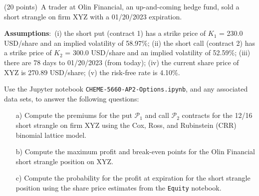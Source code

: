 \item{(20 points)~A trader at Olin Financial, an up-and-coming hedge fund, sold a short strangle on firm XYZ with a 01/20/2023 expiration. 

\textbf{Assumptions}:~(i) the short put (contract 1) has a strike price of $K_{1}$ = 230.0 USD/share and an implied volatility of 58.97\%;
(ii) the short call (contract 2) has a strike price of $K_{2}$ = 300.0 USD/share and an implied volatility of 52.59\%;
(iii) there are 78 days to 01/20/2023 (from today); (iv) the current share price of XYZ is 270.89 USD/share; (v) the risk-free rate is 4.10\%.

Use the Jupyter notebook \texttt{CHEME-5660-AP2-Options.ipynb}, and any associated data sets, to answer the following questions:

\begin{itemize}
    \item[a)]{Compute the premiums for the put $\mathcal{P}_{1}$ and call $\mathcal{P}_{2}$ contracts for the 12/16 short strangle on firm XYZ using
    the Cox, Ross, and Rubinstein (CRR) binomial lattice model. }
    \item[b)]{Compute the maximum profit and break-even points for the Olin Financial short strangle position on XYZ.}
    \item[c)]{Compute the probability for the profit at expiration for the short strangle position using the share price estimates from the \texttt{Equity} notebook. }
\end{itemize}
}